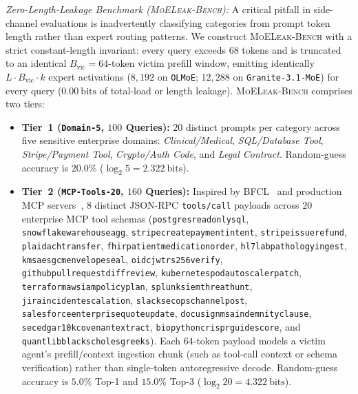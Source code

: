 \documentclass[11pt,a4paper]{article}
\renewcommand{\_}{\textunderscore\allowbreak}
\theoremstyle{definition}
\theoremstyle{remark}
\newcommand{\MLB}{\textsc{MoELeak-Bench}}
\begin{document}
\emph{Zero-Length-Leakage Benchmark (\MLB{}):} A critical pitfall in side-channel evaluations is inadvertently classifying categories from prompt token length rather than expert routing patterns. We construct \MLB{} with a strict constant-length invariant: every query exceeds $68$ tokens and is truncated to an identical $B_{\mathrm{vic}} = 64$-token victim prefill window, emitting identically $L \cdot B_{\mathrm{vic}} \cdot k$ expert activations ($8{,}192$ on \texttt{OLMoE}; $12{,}288$ on \texttt{Granite-3.1-MoE}) for every query ($0.00~\mathrm{bits}$ of total-load or length leakage). \MLB{} comprises two tiers:
\begin{itemize}
  \item \textbf{Tier~1 (\texttt{Domain-5}, $100$ Queries):} $20$ distinct prompts per category across five sensitive enterprise domains: \emph{Clinical/Medical}, \emph{SQL/Database Tool}, \emph{Stripe/Payment Tool}, \emph{Crypto/Auth Code}, and \emph{Legal Contract}. Random-guess accuracy is $20.0\%$ ($\log_2 5 = 2.322~\mathrm{bits}$).
  \item \textbf{Tier~2 (\texttt{MCP-Tools-20}, $160$ Queries):} Inspired by BFCL~\cite{patil2024bfcl} and production MCP servers~\cite{anthropic2024mcp}, $8$ distinct JSON-RPC \texttt{tools/call} payloads across $20$ enterprise MCP tool schemas (\texttt{postgres\_readonly\_sql}, \texttt{snowflake\_warehouse\_agg}, \texttt{stripe\_create\_payment\_intent}, \texttt{stripe\_issue\_refund}, \texttt{plaid\_ach\_transfer}, \texttt{fhir\_patient\_medication\_order}, \texttt{hl7\_lab\_pathology\_ingest}, \texttt{kms\_aes\_gcm\_envelope\_seal}, \texttt{oidc\_jwt\_rs256\_verify}, \texttt{github\_pull\_request\_diff\_review}, \texttt{kubernetes\_pod\_autoscaler\_patch}, \texttt{terraform\_aws\_iam\_policy\_plan}, \texttt{splunk\_siem\_threat\_hunt}, \texttt{jira\_incident\_escalation}, \texttt{slack\_secops\_channel\_post}, \texttt{salesforce\_enterprise\_quote\_update}, \texttt{docusign\_msa\_indemnity\_clause}, \texttt{sec\_edgar\_10k\_covenant\_extract}, \texttt{biopython\_crispr\_guide\_score}, and \texttt{quantlib\_black\_scholes\_greeks}). Each $64$-token payload models a victim agent's prefill/context ingestion chunk (such as tool-call context or schema verification) rather than single-token autoregressive decode. Random-guess accuracy is $5.0\%$ Top-1 and $15.0\%$ Top-3 ($\log_2 20 = 4.322~\mathrm{bits}$).
\end{itemize}
\end{document}
